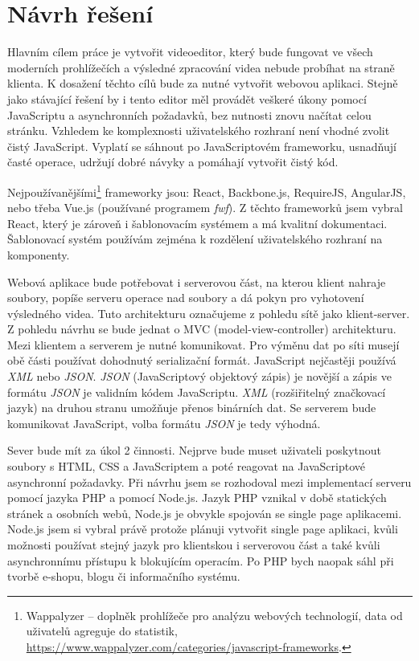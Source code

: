 \chapter{Návrh řešení}
Hlavním cílem práce je vytvořit videoeditor, který bude fungovat ve všech moderních prohlížečích a výsledné zpracování videa nebude probíhat na straně klienta. K dosažení těchto cílů bude za nutné vytvořit webovou aplikaci. Stejně jako stávající řešení by i tento editor měl provádět veškeré úkony pomocí JavaScriptu a asynchronních požadavků, bez nutnosti znovu načítat celou stránku. Vzhledem ke komplexnosti uživatelského rozhraní není vhodné zvolit čistý JavaScript. Vyplatí se sáhnout po JavaScriptovém frameworku, usnadňují časté operace, udržují dobré návyky a pomáhají vytvořit čistý kód.

Nejpoužívanějšími\footnote{Wappalyzer -- doplněk prohlížeče pro analýzu webových technologií, data od uživatelů agreguje do statistik, \url{https://www.wappalyzer.com/categories/javascript-frameworks}.} frameworky jsou: React, Backbone.js, RequireJS, AngularJS, nebo třeba Vue.js (používané programem \textit{fwf}). Z těchto frameworků jsem vybral React, který je zároveň i šablonovacím systémem a má kvalitní dokumentaci. Šablonovací systém používám zejména k rozdělení uživatelského rozhraní na komponenty.

Webová aplikace bude potřebovat i serverovou část, na kterou klient nahraje soubory, popíše serveru operace nad soubory a dá pokyn pro vyhotovení výsledného videa. Tuto architekturu označujeme z pohledu sítě jako klient-server. Z pohledu návrhu se bude jednat o MVC (model-view-controller) architekturu. Mezi klientem a serverem je nutné komunikovat. Pro výměnu dat po síti musejí obě části používat dohodnutý serializační formát. JavaScript nejčastěji používá \textit{XML} nebo \textit{JSON}. \textit{JSON} (JavaScriptový objektový zápis) je novější a zápis ve formátu \textit{JSON} je validním kódem JavaScriptu. \textit{XML} (rozšiřitelný značkovací jazyk) na druhou stranu umožňuje přenos binárních dat. Se serverem bude komunikovat JavaScript, volba formátu \textit{JSON} je tedy výhodná.

Sever bude mít za úkol 2 činnosti. Nejprve bude muset uživateli poskytnout soubory s HTML, CSS a JavaScriptem a poté reagovat na JavaScriptové asynchronní požadavky. Při návrhu jsem se rozhodoval mezi implementací serveru pomocí jazyka PHP a pomocí Node.js. Jazyk PHP vznikal v době statických stránek a osobních webů, Node.js je obvykle spojován se single page aplikacemi. Node.js jsem si vybral právě protože plánuji vytvořit single page aplikaci, kvůli možnosti používat stejný jazyk pro klientskou i serverovou část a také kvůli asynchronnímu přístupu k blokujícím operacím. Po PHP bych naopak sáhl při tvorbě e-shopu, blogu či informačního systému.

